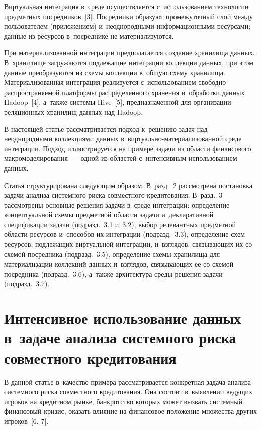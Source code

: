 \begin{multicols}{2}
      
      Виртуальная интеграция в~среде осуществляется с~использованием 
технологии предметных посредников~[3]. Посредники образуют 
промежуточный слой между пользователем (приложением) и~неоднородными 
информационными ресурсами; данные из ресурсов в~посреднике не 
материализуются. 
      
      При материализованной интеграции предполагается создание 
хранилища данных. В~хранилище загружаются подлежащие интеграции 
коллекции данных, при этом данные преобразуются из схемы коллекции 
в~общую схему хранилища. Материализованная интеграция реализуется 
с~использованием свободно распространяемой платформы распределенного 
хранения и~обработки данных Hadoop~[4], а~также системы Hive~[5], 
предназначенной для организации реляционных хранилищ данных над Hadoop.
      
      В настоящей статье рассматривается подход к~решению задач над 
неоднородными коллекциями данных в~вир\-ту\-аль\-но-ма\-те\-ри\-а\-ли\-зо\-ван\-ной среде 
интеграции. Подход иллюстрируется на примере задачи из области 
финансового макромоделирования~--- одной из областей с~интенсивным 
использованием данных.


      Статья структурирована следующим образом. В~разд.~2 рассмотрена 
постановка задачи анализа системного риска совместного кредитования. 
В~разд.~3 рассмотрены основные решения задачи в~среде интеграции: 
определение концептуальной схемы предметной области задачи 
и~декларативной спецификации задачи (подразд.~3.1 и~3.2), выбор релевантных 
предметной области ресурсов и~способов их интеграции (подразд.~3.3), 
определение схем ресурсов, подлежащих виртуальной интеграции, и~взглядов, 
связывающих их со схемой посредника (подразд.~3.5), определение схемы 
хранилища для материализации коллекций данных и~взглядов, связывающих ее 
со схемой посредника (подразд.~3.6), а~также архитектура среды решения 
задачи (подразд.~3.7).

\vspace*{-4pt}

\section{Интенсивное использование данных в~задаче анализа 
системного риска совместного кредитования}

\vspace*{-2pt}
      
      В данной статье в~качестве примера рас\-смат\-ри\-ва\-ется конкретная задача 
анализа системного риска совместного кредитования. Она состоит в~выявлении 
ведущих игроков на кредитном рынке, банкротство которых может вызвать 
системный финансовый кризис, оказать влияние на финансовое положе\-ние 
множества других игроков~[6, 7]. 
      

\end{multicols}
